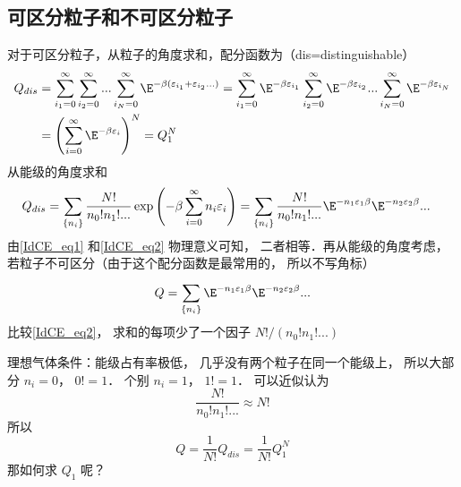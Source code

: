 
\subsection{可区分粒子和不可区分粒子}
对于可区分粒子，从粒子的角度求和，配分函数为（dis=distinguishable）
\begin{equation}\label{IdCE_eq1}
\begin{aligned}
{Q_{dis}} & = \sum\limits_{{i_1} = 0}^\infty  {\sum\limits_{{i_2} = 0}^\infty  {...\sum\limits_{{i_N} = 0}^\infty  {{\E^{ - \beta ({\varepsilon _{{i_1}}} + {\varepsilon _{{i_2}}}...)}}} } } = \sum\limits_{{i_1} = 0}^\infty  {{\E^{ - \beta {\varepsilon _{{i_1}}}}}} \sum\limits_{{i_2} = 0}^\infty  {{\E^{ - \beta {\varepsilon _{{i_2}}}}}} ...\sum\limits_{{i_N} = 0}^\infty  {{\E^{ - \beta {\varepsilon _{{i_N}}}}}} \\
& = {\left( {\sum\limits_{i = 0}^\infty  {{\E^{ - \beta {\varepsilon _i}}}} } \right)^N}= Q_1^N
\end{aligned}
\end{equation}
从能级的角度求和
\begin{equation}\label{IdCE_eq2}
\begin{aligned}
{Q_{dis}} & = \sum\limits_{\{ {n_i}\} }^{} {\frac{{N!}}{{{n_0}!{n_1}!...}}\exp \left( { - \beta \sum\limits_{i = 0}^\infty  {{n_i}{\varepsilon _i}} } \right)} = \sum\limits_{\{ {n_i}\} }^{} {\frac{{N!}}{{{n_0}!{n_1}!...}}{\E^{ - {n_1}{\varepsilon _1}\beta }}{\E^{ - {n_2}{\varepsilon _2}\beta }}...}
\end{aligned}
\end{equation}
由\autoref{IdCE_eq1} 和\autoref{IdCE_eq2} 物理意义可知， 二者相等．再从能级的角度考虑， 若粒子不可区分（由于这个配分函数是最常用的， 所以不写角标）
\begin{equation}\label{IdCE_eq3}
Q = \sum\limits_{\{ {n_i}\} }^{} {{\E^{ - {n_1}{\varepsilon _1}\beta }}{\E^{ - {n_2}{\varepsilon _2}\beta }}...}
\end{equation}
比较\autoref{IdCE_eq2}，  求和的每项少了一个因子 ${{N!}}/({{{n_0}!{n_1}!...}})$

理想气体条件：能级占有率极低， 几乎没有两个粒子在同一个能级上， 所以大部分 ${n_i} = 0$，  $0! = 1$．  个别 ${n_i} = 1$，  $1! = 1$．
可以近似认为
\begin{equation}
\frac{{N!}}{{{n_0}!{n_1}!...}} \approx N!
\end{equation}
所以
\begin{equation}
Q = \frac{1}{{N!}}{Q_{dis}} = \frac{1}{{N!}}Q_1^N
\end{equation}
那如何求 $Q_1$ 呢？ 

